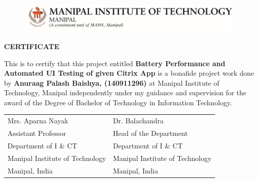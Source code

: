 \setlength\parindent{0pt}
\begin{figure}[bpht!]
	\begin{center}
		\includegraphics[scale=1]{MITLogo}
	\end{center}
\end{figure}
\begin{center}
	\large{\textbf{CERTIFICATE}}\\
\end{center}



This is to certify that this project entitled \textbf{Battery Performance and Automated UI Testing of given Citrix App} is a bonafide project work done by \textbf{Anuraag Palash Baishya, (140911296)} at Manipal Institute of Technology, Manipal independently under my guidance and supervision for the award of the Degree of Bachelor of Technology in Information Technology.



\vspace{4cm}

\begin{table}[h]
	\centering
		\begin{tabular}{p{3in} p{3in}}
			Mrs. Aparna Nayak &  Dr. Balachandra  \\
			Assistant Professor
 &    Head of the Department\\
			Department of I \& CT  &  Department of I \& CT \\
			 Manipal Institute of Technology& Manipal Institute of Technology\\
			Manipal, India &  Manipal, India 
		\end{tabular}
\end{table}
